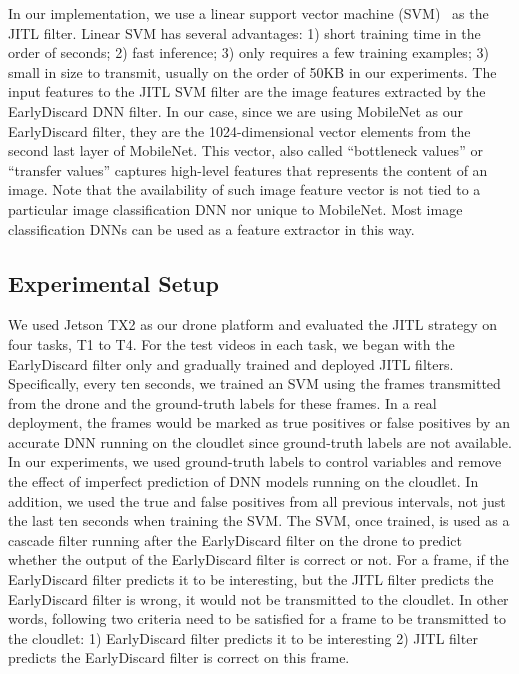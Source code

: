 In our implementation, we use a linear support vector machine
(SVM)~\cite{Friedman2001} as the JITL filter. Linear SVM has several advantages:
1) short training time in the order of seconds; 2) fast inference; 3) only
requires a few training examples; 3) small in size to transmit, usually on the
order of 50KB in our experiments. The input features to the JITL SVM filter are
the image features extracted by the EarlyDiscard DNN filter. In our case, since
we are using MobileNet as our EarlyDiscard filter, they are the 1024-dimensional
vector elements from the second last layer of MobileNet. This vector, also
called ``bottleneck values'' or ``transfer values'' captures high-level features
that represents the content of an image. Note that the availability of such
image feature vector is not tied to a particular image classification DNN nor
unique to MobileNet. Most image classification DNNs can be used as a feature
extractor in this way.

\subsection{Experimental Setup}
We used Jetson TX2 as our drone platform and evaluated the JITL strategy on four
tasks, T1 to T4. For the test videos in each task, we began with the
EarlyDiscard filter only and gradually trained and deployed JITL filters.
Specifically, every ten seconds, we trained an SVM using the frames transmitted
from the drone and the ground-truth labels for these frames. In a real
deployment, the frames would be marked as true positives or false positives by
an accurate DNN running on the cloudlet since ground-truth labels are not
available. In our experiments, we used ground-truth labels to control variables
and remove the effect of imperfect prediction of DNN models running on the
cloudlet. In addition, we used the true and false positives from all previous
intervals, not just the last ten seconds when training the SVM. The SVM, once
trained, is used as a cascade filter running after the EarlyDiscard filter on
the drone to predict whether the output of the EarlyDiscard filter is correct or
not. For a frame, if the EarlyDiscard filter predicts it to be interesting, but
the JITL filter predicts the EarlyDiscard filter is wrong, it would not be
transmitted to the cloudlet. In other words, following two criteria need to be
satisfied for a frame to be transmitted to the cloudlet: 1) EarlyDiscard filter
predicts it to be interesting 2) JITL filter predicts the EarlyDiscard filter is
correct on this frame.

